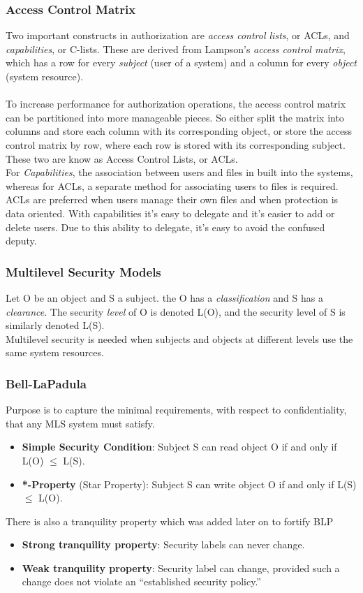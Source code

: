 \documentclass[a4paper]{article}
\begin{document}
\subsubsection{Access Control Matrix}
Two important constructs in authorization are \textit{access control lists}, or ACLs, and \textit{capabilities}, or C-lists. These are derived from Lampson's \textit{access control matrix}, which has a row for every \textit{subject} (user of a system) and a column for every \textit{object} (system resource).\\\\
To increase performance for authorization operations, the access control matrix can be partitioned into more manageable pieces. So either split the matrix into columns and store each column with its corresponding object, or store the access control matrix by row, where each row is stored with its corresponding subject.
These two are know as Access Control Lists, or ACLs.\\
For \textit{Capabilities}, the association between users and files in built into the systems, whereas for ACLs, a separate method for associating users to files is required.\\
ACLs are preferred when users manage their own files and when protection is data oriented. With capabilities it's easy to delegate and it's easier to add or delete users. Due to this ability to delegate, it's easy to avoid the confused deputy.

\subsubsection{Multilevel Security Models}
Let O be an object and S a subject. the O has a \textit{classification} and S has a \textit{clearance}. The security \textit{level} of O is denoted L(O), and the security level of S is similarly denoted L(S).\\
Multilevel security is needed when subjects and objects at different levels use the same system resources.

\subsubsection{Bell-LaPadula}
Purpose is to capture the minimal requirements, with respect to confidentiality, that any MLS system must satisfy.
\begin{itemize}
    \item \textbf{Simple Security Condition}: Subject S can read object O if and only if L(O) $\leq$ L(S).
    \item \textbf{*-Property} (Star Property): Subject S can write object O if and only if L(S) $\leq$ L(O).
\end{itemize}
There is also a tranquility property which was added later on to fortify BLP
\begin{itemize}
    \item\textbf{Strong tranquility property}: Security labels can never change.
    \item \textbf{Weak tranquility property}: Security label can change, provided such a change does not violate an ``established security policy.''
\end{itemize}
\end{document}
